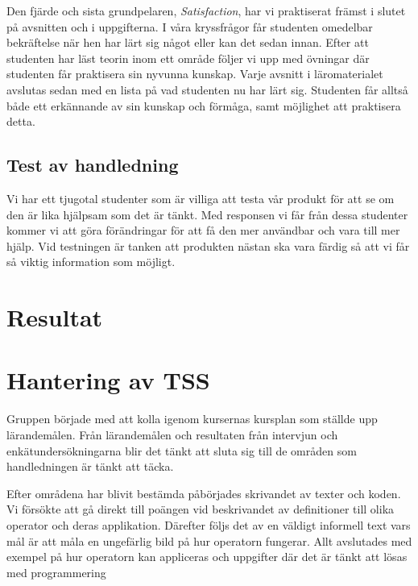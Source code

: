 \documentclass[]{article}
\begin{document}
Den fjärde och sista grundpelaren, \textit{Satisfaction}, har vi praktiserat främst i slutet på 
avsnitten och i uppgifterna. I våra kryssfrågor får studenten omedelbar bekräftelse när hen har lärt sig 
något eller kan det sedan innan. Efter att studenten har läst teorin inom ett område följer vi upp med 
övningar där studenten får praktisera sin nyvunna kunskap. Varje avsnitt i läromaterialet avslutas sedan 
med en lista på vad studenten nu har lärt sig. Studenten får alltså både ett erkännande av sin kunskap 
och förmåga, samt möjlighet att praktisera detta. 

\subsection{Test av handledning}

Vi har ett tjugotal studenter som är villiga att testa vår produkt för
att se om den är lika hjälpsam som det är tänkt. Med responsen vi får
från dessa studenter kommer vi att göra förändringar för att få den mer
användbar och vara till mer hjälp. Vid testningen är tanken att
produkten nästan ska vara färdig så att vi får så viktig information som
möjligt.

\section{Resultat}


%

\section{Hantering av TSS}

Gruppen började med att kolla igenom kursernas kursplan som ställde upp lärandemålen. Från lärandemålen och resultaten från intervjun och enkätundersökningarna blir det tänkt att sluta sig till de områden som handledningen är tänkt att täcka. %

Efter områdena har blivit bestämda påbörjades skrivandet av texter och koden. %
Vi försökte att gå direkt till poängen vid beskrivandet av definitioner till olika operator och deras applikation. Därefter följs det av en väldigt informell text vars mål är att måla en ungefärlig bild på hur operatorn fungerar. Allt avslutades med exempel på hur operatorn kan appliceras och uppgifter där det är tänkt att lösas med programmering 
\end{document}
